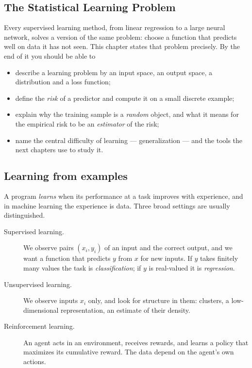 \begin{notechapter}
\chapter{The Statistical Learning Problem}\label{ch:learning-problem}

\begin{chapterintro}
Every supervised learning method, from linear regression to a large neural
network, solves a version of the same problem: choose a function that
predicts well on data it has not seen. This chapter states that problem
precisely. By the end of it you should be able to
\begin{itemize}[nosep]
  \item describe a learning problem by an input space, an output space, a
        distribution and a loss function;
  \item define the \emph{risk} of a predictor and compute it on a small
        discrete example;
  \item explain why the training sample is a \emph{random} object, and what
        it means for the empirical risk to be an \emph{estimator} of the risk;
  \item name the central difficulty of learning --- generalization --- and the
        tools the next chapters use to study it.
\end{itemize}
\end{chapterintro}

\section{Learning from examples}\label{learning-problem:sec:types}

A program \emph{learns} when its performance at a task improves with
experience, and in machine learning the experience is data. Three broad
settings are usually distinguished.

\begin{description}
  \item[Supervised learning.] We observe pairs $(x_i, y_i)$ of an input and
        the correct output, and we want a function that predicts $y$ from $x$
        for new inputs. If $y$ takes finitely many values the task is
        \emph{classification}; if $y$ is real-valued it is \emph{regression}.
  \item[Unsupervised learning.] We observe inputs $x_i$ only, and look for
        structure in them: clusters, a low-dimensional representation, an
        estimate of their density.
  \item[Reinforcement learning.] An agent acts in an environment, receives
        rewards, and learns a policy that maximizes its cumulative reward. The
        data depend on the agent's own actions.
\end{description}


\end{notechapter}
